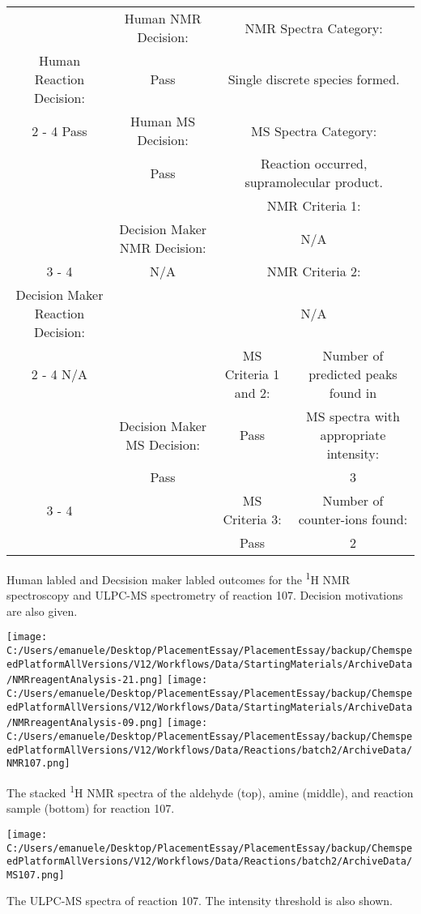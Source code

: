 \documentclass{article}%
\begin{document}
\begin{Decision Table}[H]%
\begin{tabular}{|c|c|c|c|}%
\hline%
&Human NMR Decision:&\multicolumn{2}{|c|}{NMR Spectra Category:}\\%
Human Reaction Decision:&Pass&\multicolumn{2}{|c|}{Single discrete species formed.}\\%
\cline{2%
-%
4}%
Pass&Human MS Decision:&\multicolumn{2}{|c|}{MS Spectra Category:}\\%
&Pass&\multicolumn{2}{|c|}{Reaction occurred, supramolecular product.}\\%
\hline%
&&\multicolumn{2}{|c|}{NMR Criteria 1:}\\%
&Decision Maker NMR Decision:&\multicolumn{2}{|c|}{N/A}\\%
\cline{3%
-%
4}%
&N/A&\multicolumn{2}{|c|}{NMR Criteria 2:}\\%
Decision Maker Reaction Decision:&&\multicolumn{2}{|c|}{N/A}\\%
\cline{2%
-%
4}%
N/A&&MS Criteria 1 and 2:&Number of predicted peaks found in\\%
&Decision Maker MS Decision:&Pass&MS spectra with appropriate intensity:\\%
&Pass&&3\\%
\cline{3%
-%
4}%
&&MS Criteria 3:&Number of counter{-}ions found:\\%
&&Pass&2\\%
\hline%
\end{tabular}%
\caption{Human labled and Decsision maker labled outcomes for the \textsuperscript{1}H NMR spectroscopy and ULPC-MS spectrometry of reaction 107. Decision motivations are also given.}%
\end{Decision Table}%
\begin{NMR Spectra}[H]%
\begin{center}%
\texttt{[image: C:/Users/emanuele/Desktop/PlacementEssay/PlacementEssay/backup/ChemspeedPlatformAllVersions/V12/Workflows/Data/StartingMaterials/ArchiveData/NMRreagentAnalysis-21.png]}\hfill%
\texttt{[image: C:/Users/emanuele/Desktop/PlacementEssay/PlacementEssay/backup/ChemspeedPlatformAllVersions/V12/Workflows/Data/StartingMaterials/ArchiveData/NMRreagentAnalysis-09.png]}\hfill%
\texttt{[image: C:/Users/emanuele/Desktop/PlacementEssay/PlacementEssay/backup/ChemspeedPlatformAllVersions/V12/Workflows/Data/Reactions/batch2/ArchiveData/NMR107.png]}\hfill%
\end{center}%
\caption{The stacked \textsuperscript{1}H NMR spectra of the aldehyde (top), amine (middle), and reaction sample (bottom) for reaction 107.}%
\end{NMR Spectra}%
\begin{MS Spectra}[H]%
\begin{center}%
\texttt{[image: C:/Users/emanuele/Desktop/PlacementEssay/PlacementEssay/backup/ChemspeedPlatformAllVersions/V12/Workflows/Data/Reactions/batch2/ArchiveData/MS107.png]}\hfill%
\end{center}%
\caption{The ULPC-MS spectra of reaction 107. The intensity threshold is also shown.}%
\end{MS Spectra}%
\end{document}
